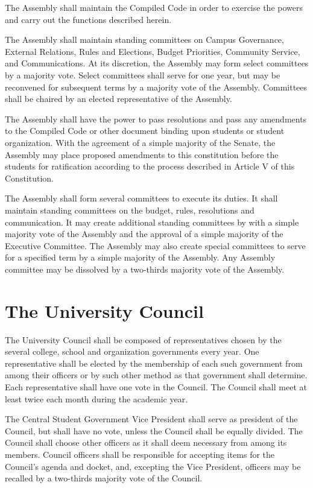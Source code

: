     The Assembly shall maintain the Compiled Code in order to exercise the powers and carry out the functions described herein.

    The Assembly shall maintain standing committees on Campus Governance, External Relations, Rules and Elections, Budget Priorities, Community Service, and Communications. At its discretion, the Assembly may form select committees by a majority vote. Select committees shall serve for one year, but may be reconvened for subsequent terms by a majority vote of the Assembly. Committees shall be chaired by an elected representative of the Assembly.

    The Assembly shall have the power to pass resolutions and pass any amendments to the Compiled Code or other document binding upon students or student organization. With the agreement of a simple majority of the Senate, the Assembly may place proposed amendments to this constitution before the students for ratification according to the process described in Article V of this Constitution.

    The Assembly shall form several committees to execute its duties. It shall maintain standing committees on the budget, rules, resolutions and communication. It may create additional standing committees by with a simple majority vote of the Assembly and the approval of a simple majority of the Executive Committee. The Assembly may also create special committees to serve for a specified term by a simple majority of the Assembly. Any Assembly committee may be dissolved by a two-thirds majority vote of the Assembly.

\section{The University Council}
    The University Council shall be composed of representatives chosen by the several college, school and organization governments every year. One representative shall be elected by the membership of each such government from among their officers or by such other method as that government shall determine. Each representative shall have one vote in the Council. The Council shall meet at least twice each month during the academic year.

    The Central Student Government Vice President shall serve as president of the Council, but shall have no vote, unless the Council shall be equally divided. The Council shall choose other officers as it shall deem necessary from among its members. Council officers shall be responsible for accepting items for the Council's agenda and docket, and, excepting the Vice President, officers may be recalled by a two-thirds majority vote of the Council.
  
